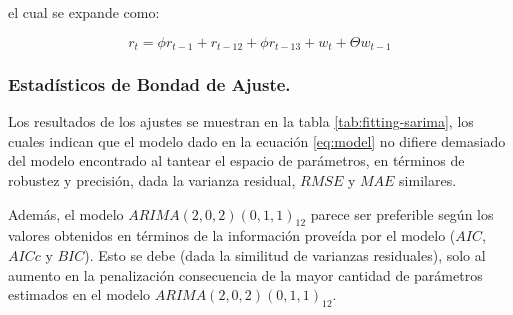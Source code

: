 \documentclass[]{article}
\newenvironment{Shaded}{\begin{snugshade}}{\end{snugshade}}
\newcommand{\CharTok}[1]{\textcolor[rgb]{0.31,0.60,0.02}{#1}}
\newcommand{\DataTypeTok}[1]{\textcolor[rgb]{0.13,0.29,0.53}{#1}}
\newcommand{\DecValTok}[1]{\textcolor[rgb]{0.00,0.00,0.81}{#1}}
\newcommand{\KeywordTok}[1]{\textcolor[rgb]{0.13,0.29,0.53}{\textbf{#1}}}
\newcommand{\NormalTok}[1]{#1}
\newcommand{\OperatorTok}[1]{\textcolor[rgb]{0.81,0.36,0.00}{\textbf{#1}}}
\newcommand{\OtherTok}[1]{\textcolor[rgb]{0.56,0.35,0.01}{#1}}
\newcommand{\StringTok}[1]{\textcolor[rgb]{0.31,0.60,0.02}{#1}}
\begin{document}
el cual se expande como:

\[r_t = \phi r_{t-1} + r_{t-12} + \phi r_{t-13} + w_t + \Theta w_{t-1}\label{eq:model}\]

\hypertarget{estaduxedsticos-de-bondad-de-ajuste.}{%
\subsubsection{Estadísticos de Bondad de Ajuste.}\label{estaduxedsticos-de-bondad-de-ajuste.}}

Los resultados de los ajustes se muestran en la tabla \ref{tab:fitting-sarima}, los cuales indican que el modelo dado en la ecuación \ref{eq:model} no difiere demasiado del modelo encontrado al tantear el espacio de parámetros, en términos de robustez y precisión, dada la varianza residual, \(RMSE\) y \(MAE\) similares.

Además, el modelo \(ARIMA(2, 0, 2)(0, 1, 1)_{12}\) parece ser preferible según los valores obtenidos en términos de la información proveída por el modelo (\(AIC\), \(AICc\) y \(BIC\)). Esto se debe (dada la similitud de varianzas residuales), solo al aumento en la penalización consecuencia de la mayor cantidad de parámetros estimados en el modelo \(ARIMA(2, 0, 2)(0, 1, 1)_{12}\).

\begin{Shaded}
\end{Shaded}
\end{document}

